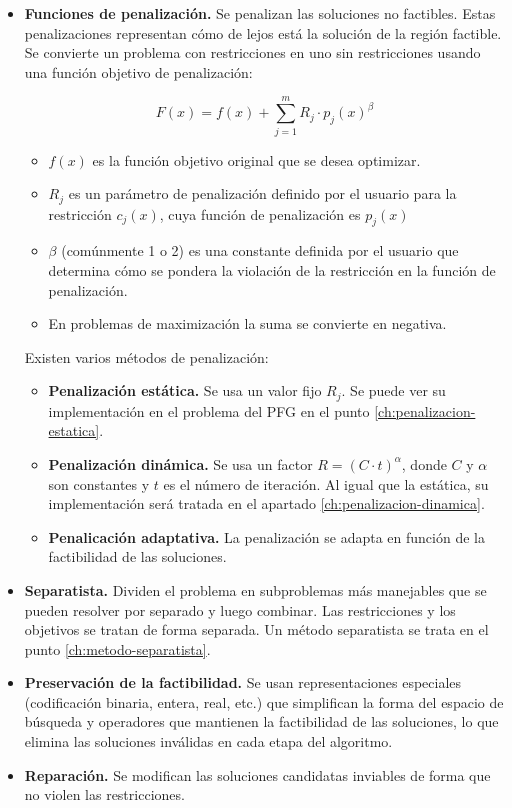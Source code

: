 \begin{itemize}
  \item \textbf{Funciones de penalización.} Se penalizan las soluciones no factibles. Estas penalizaciones representan cómo de lejos está la solución de la región factible. Se convierte un problema con restricciones en uno sin restricciones usando una función objetivo de penalización:
  
  \[
  F(x) = f(x) + \sum_{j=1}^{m} R_j \cdot p_j(x)^\beta
  \]
  
  \begin{itemize}
    \item \( f(x) \) es la función objetivo original que se desea optimizar.
    \item \( R_j \) es un parámetro de penalización definido por el usuario para la restricción \( c_j(x) \), cuya función de penalización es \( p_j(x) \)
    \item \( \beta \) (comúnmente 1 o 2) es una constante definida por el usuario que determina cómo se pondera la violación de la restricción en la función de penalización.
    \item En problemas de maximización la suma se convierte en negativa.     
  \end{itemize}
  Existen varios métodos de penalización:
    \begin{itemize}
      \item \textbf{Penalización estática.} Se usa un valor fijo \( R_j \). Se puede ver su implementación en el problema del PFG en el punto \ref{ch:penalizacion-estatica}.
      \item \textbf{Penalización dinámica.} Se usa un factor \( R = (C \cdot t) ^ {\alpha} \), donde \( C \) y \( \alpha \) son constantes y \( t \) es el número de iteración. Al igual que la estática, su implementación será tratada en el apartado \ref{ch:penalizacion-dinamica}.
      \item \textbf{Penalicación adaptativa.} La penalización se adapta en función de la factibilidad de las soluciones.
    \end{itemize}
  \item \textbf{Separatista.} Dividen el problema en subproblemas más manejables que se pueden resolver por separado y luego combinar. Las restricciones y los objetivos se tratan de forma separada. Un método separatista se trata en el punto \ref{ch:metodo-separatista}.
  \item \textbf{Preservación de la factibilidad.} Se usan representaciones especiales (codificación binaria, entera, real, etc.) que simplifican la forma del espacio de búsqueda y operadores que mantienen la factibilidad de las soluciones, lo que elimina las soluciones inválidas en cada etapa del algoritmo.
  \item \textbf{Reparación.} Se modifican las soluciones candidatas inviables de forma que no violen las restricciones.
\end{itemize}

